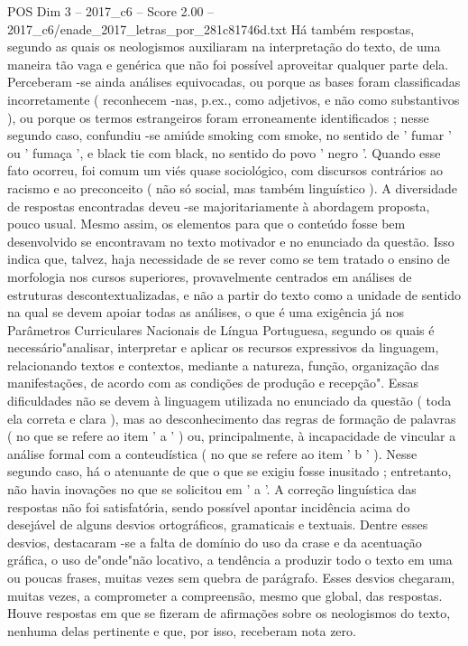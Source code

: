 \begin{textsample}{POS Dim 3 – 2017\_c6 – Score 2.00 – 2017\_c6/enade\_2017\_letras\_por\_281c81746d.txt}
Há também respostas, segundo as quais os neologismos auxiliaram na interpretação do texto, de uma maneira tão vaga e genérica que não foi possível aproveitar qualquer parte dela.
Perceberam -se ainda análises equivocadas, ou porque as bases foram classificadas incorretamente ( reconhecem -nas, p.ex., como adjetivos, e não como substantivos ), ou porque os termos estrangeiros foram erroneamente identificados ; nesse segundo caso, confundiu -se amiúde smoking com smoke, no sentido de ' fumar ' ou ' fumaça ', e black tie com black, no sentido do povo ' negro '.
Quando esse fato ocorreu, foi comum um viés quase sociológico, com discursos contrários ao racismo e ao preconceito ( não só social, mas também linguístico ).
A diversidade de respostas encontradas deveu -se majoritariamente à abordagem proposta, pouco usual.
Mesmo assim, os elementos para que o conteúdo fosse bem desenvolvido se encontravam no texto motivador e no enunciado da questão.
Isso indica que, talvez, haja necessidade de se rever como se tem tratado o ensino de morfologia nos cursos superiores, provavelmente centrados em análises de estruturas descontextualizadas, e não a partir do texto como a unidade de sentido na qual se devem apoiar todas as análises, o que é uma exigência já nos Parâmetros Curriculares Nacionais de Língua Portuguesa, segundo os quais é necessário"analisar, interpretar e aplicar os recursos expressivos da linguagem, relacionando textos e contextos, mediante a natureza, função, organização das manifestações, de acordo com as condições de produção e recepção".
Essas dificuldades não se devem à linguagem utilizada no enunciado da questão ( toda ela correta e clara ), mas ao desconhecimento das regras de formação de palavras ( no que se refere ao item ' a ' ) ou, principalmente, à incapacidade de vincular a análise formal com a conteudística ( no que se refere ao item ' b ' ).
Nesse segundo caso, há o atenuante de que o que se exigiu fosse inusitado ; entretanto, não havia inovações no que se solicitou em ' a '.
A correção linguística das respostas não foi satisfatória, sendo possível apontar incidência acima do desejável de alguns desvios ortográficos, gramaticais e textuais.
Dentre esses desvios, destacaram -se a falta de domínio do uso da crase e da acentuação gráfica, o uso de"onde"não locativo, a tendência a produzir todo o texto em uma ou poucas frases, muitas vezes sem quebra de parágrafo.
Esses desvios chegaram, muitas vezes, a comprometer a compreensão, mesmo que global, das respostas.
Houve respostas em que se fizeram de afirmações sobre os neologismos do texto, nenhuma delas pertinente e que, por isso, receberam nota zero.

\end{textsample}
